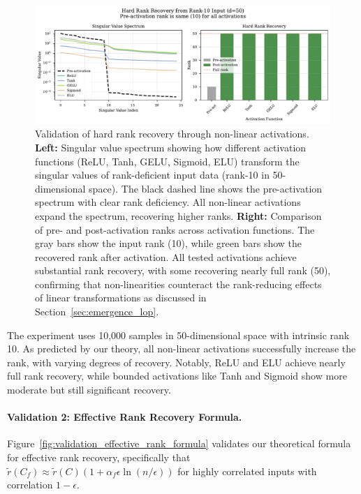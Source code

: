 \documentclass{article}
\numberwithin{figure}{section}
\begin{document}
\begin{figure}[ht!]
    \centering
    \includegraphics[width=0.9\linewidth]{validation_hard_rank_recovery.pdf}
    \caption{Validation of hard rank recovery through non-linear activations. \textbf{Left:} Singular value spectrum showing how different activation functions (ReLU, Tanh, GELU, Sigmoid, ELU) transform the singular values of rank-deficient input data (rank-10 in 50-dimensional space). The black dashed line shows the pre-activation spectrum with clear rank deficiency. All non-linear activations expand the spectrum, recovering higher ranks. \textbf{Right:} Comparison of pre- and post-activation ranks across activation functions. The gray bars show the input rank (10), while green bars show the recovered rank after activation. All tested activations achieve substantial rank recovery, with some recovering nearly full rank (50), confirming that non-linearities counteract the rank-reducing effects of linear transformations as discussed in Section~\ref{sec:emergence_lop}.}
    \label{fig:validation_hard_rank_recovery}
\end{figure}

The experiment uses 10,000 samples in 50-dimensional space with intrinsic rank 10. As predicted by our theory, all non-linear activations successfully increase the rank, with varying degrees of recovery. Notably, ReLU and ELU achieve nearly full rank recovery, while bounded activations like Tanh and Sigmoid show more moderate but still significant recovery.

\paragraph{Validation 2: Effective Rank Recovery Formula.}
Figure~\ref{fig:validation_effective_rank_formula} validates our theoretical formula for effective rank recovery, specifically that $\tilde{r}(C_f) \approx \tilde{r}(C)(1 + \alpha_f \epsilon \ln(n/\epsilon))$ for highly correlated inputs with correlation $1-\epsilon$.
\end{document}
